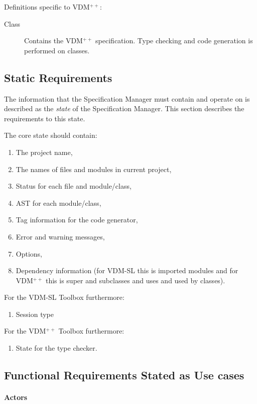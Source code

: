 \documentclass[11pt]{article}
\newcommand{\vdmpp}{{\small VDM}$^{++}$\/}
\newcommand{\vdmsl}{\small VDM-SL\/}
\newcommand{\specman} {Specification Manager}
\begin{document}
Definitions specific to \vdmpp{}:
\begin{description}
\item[Class] Contains the \vdmpp{} specification. Type checking and
  code generation is performed on classes.
\end{description}

\subsection{Static Requirements}
\label{sec:statreq}

The information that the \specman{} must contain and operate on is
described as the \textit{state} of the \specman{}. This section
describes the requirements to this state. 

The core state should contain:
\begin{enumerate}
\item The project name,
\item The names of files and modules in current project,
\item Status for each file and module/class,
\item AST for each module/class,
\item Tag information for the code generator,
\item Error and warning messages,
\item Options,
\item Dependency information (for \vdmsl{} this is imported modules
  and for \vdmpp{} this is super and subclasses and uses and used by
  classes).
\end{enumerate}

For the \vdmsl{} Toolbox furthermore:
\begin{enumerate}
\item Session type
\end{enumerate}

For the \vdmpp{} Toolbox furthermore:
\begin{enumerate}
\item State for the type checker.
\end{enumerate}

\subsection{Functional Requirements Stated as Use cases}
\label{sec:requse}
 

\paragraph{Actors}
\end{document}

